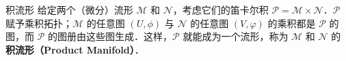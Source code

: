 \begin{definition}{积流形}
给定两个（微分）流形 $\mathcal{M}$ 和 $\mathcal{N}$，考虑它们的笛卡尔积 $\mathcal{P}=\mathcal{M}\times\mathcal{N}$．$\mathcal{P}$ 赋予乘积拓扑；$\mathcal{M}$ 的任意图 $(U, \phi)$ 与 $\mathcal{N}$ 的任意图 $(V, \varphi)$ 的乘积都是 $\mathcal{P}$ 的图，而 $\mathcal{P}$ 的图册由这些图生成．这样，$\mathcal{P}$ 就能成为一个流形，称为 $\mathcal{M}$ 和 $\mathcal{N}$ 的\textbf{积流形（Product Manifold）}．
\end{definition}